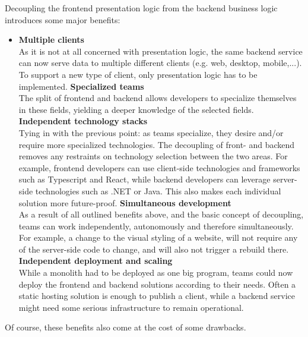 Decoupling the \gls{frontend} presentation logic from the \gls{backend} business logic
introduces some major benefits: \autocite{Dunkley_2016}
\begin{itemize}
    \item \textbf{Multiple clients}\\
    As it is not at all concerned with presentation logic, the same
    \gls{backend} service can now serve data to multiple different clients (e.g.
    web, desktop, mobile,...). To support a new type of client, only
    presentation logic has to be implemented.
    \spacedItem  \textbf{Specialized teams}\\
    The split of \gls{frontend} and \gls{backend} allows developers to
    specialize themselves in these fields, yielding a deeper knowledge of the
    selected fields. 
    \spacedItem  \textbf{Independent technology stacks}\\
    Tying in with the previous point: as teams specialize, they desire and/or
    require more specialized technologies. The decoupling of front- and
    \gls{backend} removes any restraints on technology selection between the two
    areas. For example, \gls{frontend} developers can use client-side
    technologies and frameworks such as Typescript and React, while
    \gls{backend} developers can leverage server-side technologies such as .NET
    or Java. This also makes each individual solution more future-proof.
    \spacedItem  \textbf{Simultaneous development}\\
    As a result of all outlined benefits above, and the basic concept of
    decoupling, teams can work independently, autonomously and therefore
    simultaneously. For example, a change to the visual styling of a website,
    will not require any of the server-side code to change, and will also not
    trigger a rebuild there. 
    \spacedItem  \textbf{Independent deployment and scaling}\\
    While a \gls{monolith} had to be deployed as one big program, teams could now
    deploy the \gls{frontend} and \gls{backend} solutions according to their
    needs. Often a static hosting solution is enough to publish a client, while
    a \gls{backend} service might need some serious infrastructure to remain
    operational.
\end{itemize}


Of course, these benefits also come at the cost of some drawbacks. 

